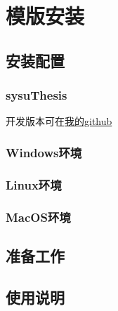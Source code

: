 \chapter{模版安装}
\section{安装配置}
\subsection{sysuThesis}
开发版本可在\href{github.com/dalwzm}{我的github}
\subsection{Windows环境}
\subsection{Linux环境}
\subsection{MacOS环境}
\section{准备工作}
\section{使用说明}